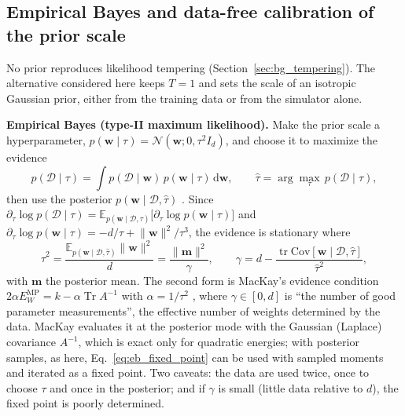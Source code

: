 \documentclass[11pt]{article}
\begin{document}
\subsection{Empirical Bayes and data-free calibration of the prior scale}
\label{app:bg_eb}
No prior reproduces likelihood tempering (Section~\ref{sec:bg_tempering}). The alternative considered here keeps
$T=1$ and sets the scale of an isotropic Gaussian prior, either from the training data or from the simulator alone.

\textbf{Empirical Bayes (type-II maximum likelihood).} Make the prior scale a hyperparameter,
$p(\mathbf w\mid\tau)=\mathcal{N}(\mathbf w;0,\tau^2 I_d)$, and choose it to maximize the evidence
\begin{equation}
p(\mathcal{D}\mid\tau)=\int p(\mathcal{D}\mid\mathbf w)\,p(\mathbf w\mid\tau)\,\mathrm{d}\mathbf w,\qquad
\hat\tau=\arg\max_\tau\,p(\mathcal{D}\mid\tau),
\end{equation}
then use the posterior $p(\mathbf w\mid\mathcal{D},\hat\tau)$ \citep{mackay1992practical}. Since
$\partial_\tau\log p(\mathcal{D}\mid\tau)=\mathbb{E}_{p(\mathbf w\mid\mathcal{D},\tau)}\big[\partial_\tau\log p(\mathbf w\mid\tau)\big]$
and $\partial_\tau\log p(\mathbf w\mid\tau)=-d/\tau+\lVert\mathbf w\rVert^2/\tau^3$, the evidence is stationary where
\begin{equation}
\label{eq:eb_fixed_point}
\hat\tau^2=\frac{\mathbb{E}_{p(\mathbf w\mid\mathcal{D},\hat\tau)}\lVert\mathbf w\rVert^2}{d}
=\frac{\lVert\mathbf m\rVert^2}{\gamma},\qquad
\gamma=d-\frac{\operatorname{tr}\mathrm{Cov}[\mathbf w\mid\mathcal{D},\hat\tau]}{\hat\tau^2},
\end{equation}
with $\mathbf m$ the posterior mean. The second form is MacKay's evidence condition
$2\alpha E_W^{\mathrm{MP}}=k-\alpha\operatorname{Tr}\!A^{-1}$ with $\alpha=1/\tau^2$
\citep[Eqs.~2.22--2.23]{mackay1992thesis}, where $\gamma\in[0,d]$ is ``the number of good parameter measurements'',
the effective number of weights determined by the data. MacKay evaluates it at the posterior mode with the
Gaussian (Laplace) covariance $A^{-1}$, which is exact only for quadratic energies; with posterior samples, as here,
Eq.~\eqref{eq:eb_fixed_point} can be used with sampled moments and iterated as a fixed point. Two caveats: the data
are used twice, once to choose $\tau$ and once in the posterior; and if $\gamma$ is small (little data relative to
$d$), the fixed point is poorly determined.
\end{document}
